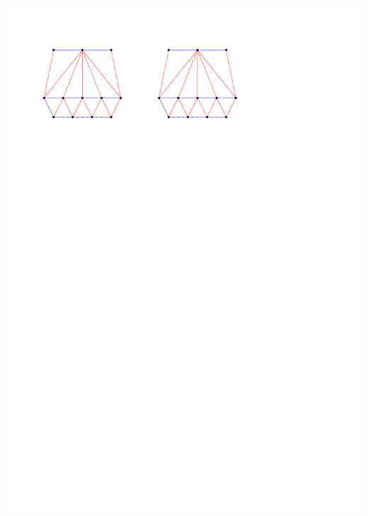 \documentclass[a4paper]{article}
\begin{document}
\includegraphics[width =\textwidth]{topFanFlips/img/splitfront}
\clearpage%
\end{document}
